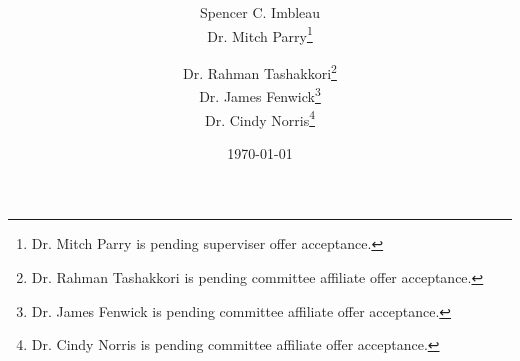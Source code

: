 \title{
\thesistitle
}
\author{
Spencer C. Imbleau\\
Dr. Mitch Parry\thanks{Dr. Mitch Parry is pending superviser offer acceptance.} \\
  \and
Dr. Rahman Tashakkori\thanks{Dr. Rahman Tashakkori is pending committee affiliate offer acceptance.} \\
Dr. James Fenwick\thanks{Dr. James Fenwick is pending committee affiliate offer acceptance.} \\
Dr. Cindy Norris\thanks{Dr. Cindy Norris is pending committee affiliate offer acceptance.}
}
\date{\today}

\vfill
\maketitle
\vfill